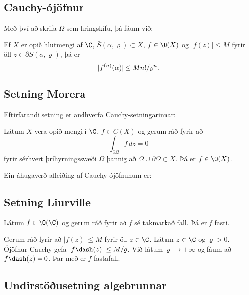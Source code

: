 \subsection*{Cauchy-ójöfnur}



Með því að skrifa $\Omega$ sem hringskífu, þá fáum við:

\begin{fs}  Ef
$X$ er opið hlutmengi af $\C$, $\bar S(\alpha,\varrho)\subset X$,
$f\in \O(X)$ og $|f(z)|\leq M$ fyrir öll $z\in \partial
S(\alpha,\varrho)$, þá er $$ |f\sp{(n)}(\alpha)|\leq
Mn!/\varrho\sp n. $$
\end{fs}


\subsection*{Setning Morera}


Eftirfarandi setning er andhverfa  Cauchy-setningarinnar: 

\begin{se}  
Látum $X$ vera opið mengi í $\C$,  $f\in C(X)$ og
gerum ráð fyrir að  
 $$\int_{\partial\Omega} f\, dz =0
 $$
fyrir sérhvert þríhyrningssvæði $\Omega$ þannig að $\Omega\cup
\partial \Omega\subset X$.  Þá er $f\in \O(X)$.
\end{se}
Ein áhugaverð afleiðing af Cauchy-ójöfnunum er:


\subsection*{Setning Liurville}




\begin{se} Látum $f\in \O(\C)$ og gerum ráð fyrir að
$f$ sé takmarkað fall.  Þá er $f$ fasti.  
\end{se}
\begin{so} 
Gerum ráð fyrir að $|f(z)|\leq M$ fyrir öll $z\in \C$.
Látum $z\in\C$ og $\varrho>0$.  Ójöfnur Cauchy gefa 
 $|f\dash(z)|\leq  M/\varrho$.
Við látum $\varrho\to +\infty$ og fáum að $f\dash(z)=0$.
Þar með er $f$ fastafall.
\end{so}



\subsection*{Undirstöðusetning algebrunnar}


